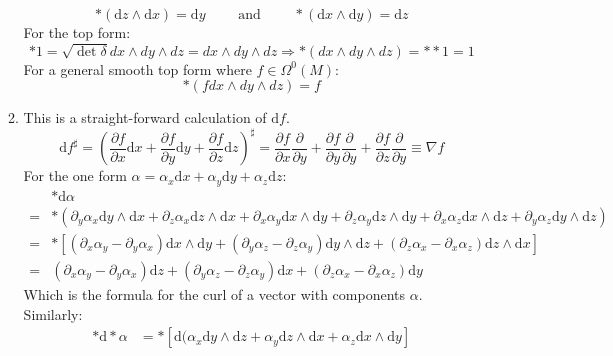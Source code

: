 \documentclass[12pt,a4]{article}
\newcommand{\e}{\mathrm{d}}
\begin{document}
\begin{enumerate}
\begin{enumerate}
\begin{equation*}
          *(\e z \wedge \e x) = \e y \qquad \text{ and } \qquad *(\e x \wedge \e y) = \e z
        \end{equation*}
        For the top form:
        \begin{equation*}
          * 1 = \sqrt{\det \delta} dx \wedge dy \wedge dz = dx \wedge dy \wedge dz \Rightarrow *(dx \wedge dy \wedge dz) = ** 1 = 1
        \end{equation*}
        For a general smooth top form where $f \in \Omega^0(M)$:
        \begin{equation*}
          *(f dx \wedge dy \wedge dz) = f
        \end{equation*}
      \item
        This is a straight-forward calculation of $\e f$.
        \begin{equation*}
          \e f^\sharp = \left(\frac{\partial f}{\partial x} \e x + \frac{\partial f}{\partial y} \e y + \frac{\partial f}{\partial z} \e z\right)^\sharp = \frac{\partial f}{\partial x}\frac{\partial}{\partial y} + \frac{\partial f}{\partial y}\frac{\partial }{\partial y}  + \frac{\partial f}{\partial z}\frac{\partial}{\partial y} \equiv \nabla f
        \end{equation*}
        For the one form $\alpha = \alpha_x \e x + \alpha_y \e y + \alpha_z \e z$:
        \begin{align*}
          &* \e \alpha \\
                      =& *(\partial_y\alpha_x \e y \wedge \e x + \partial_z \alpha_x \e z \wedge \e x + \partial_x\alpha_y \e x \wedge \e y + \partial_z \alpha_y \e z \wedge \e y + \partial_x\alpha_z \e x \wedge \e z + \partial_y \alpha_z \e y \wedge \e z)\\
                      =& *\left[(\partial_x\alpha_y - \partial_y\alpha_x) \e x \wedge \e y + (\partial_y \alpha_z - \partial_z \alpha_y)\e y \wedge \e z + (\partial_z \alpha_x - \partial_x \alpha_z)\e z \wedge \e x \right]\\
                      =& (\partial_x\alpha_y - \partial_y\alpha_x) \e z + (\partial_y \alpha_z - \partial_z \alpha_y) \e x + (\partial_z \alpha_x - \partial_x \alpha_z)\e y 
        \end{align*}
        Which is the formula for the curl of a vector with components $\alpha$.
        Similarly:
        \begin{align*}
          * \e * \alpha 
                      &= *\left[\e (\alpha_x \e y \wedge \e z + \alpha_y \e z \wedge \e x + \alpha_z \e x \wedge \e y\right]\\

\end{align*}
\end{enumerate}
\end{enumerate}
\end{document}
